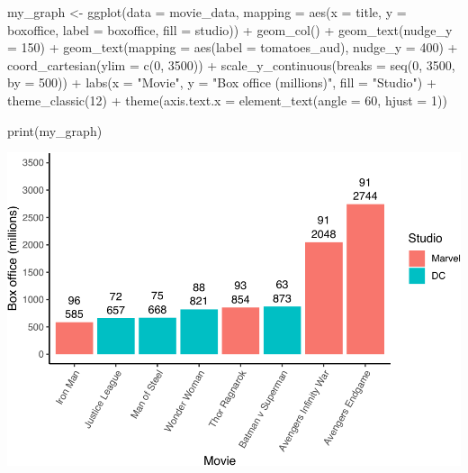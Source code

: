 \documentclass[
]{krantz}
\makeatletter
\newenvironment{Shaded}{\begin{snugshade}}{\end{snugshade}}
\newcommand{\AttributeTok}[1]{\textcolor[rgb]{0.61,0.61,0.61}{#1}}
\newcommand{\DecValTok}[1]{\textcolor[rgb]{0.06,0.06,0.06}{#1}}
\newcommand{\FunctionTok}[1]{\textcolor[rgb]{0,0,0}{#1}}
\newcommand{\NormalTok}[1]{#1}
\newcommand{\OtherTok}[1]{\textcolor[rgb]{0.37,0.37,0.37}{#1}}
\newcommand{\SpecialCharTok}[1]{\textcolor[rgb]{0,0,0}{#1}}
\newcommand{\StringTok}[1]{\textcolor[rgb]{0.5,0.5,0.5}{#1}}
\newenvironment{kframe}{%
\medskip{}
\setlength{\fboxsep}{.8em}
 \def\at@end@of@kframe{}%
 \ifinner\ifhmode%
  \def\at@end@of@kframe{\end{minipage}}%
  \begin{minipage}{\columnwidth}%
 \fi\fi%
 \def\FrameCommand##1{\hskip\@totalleftmargin \hskip-\fboxsep
 \colorbox{shadecolor}{##1}\hskip-\fboxsep
     \hskip-\linewidth \hskip-\@totalleftmargin \hskip\columnwidth}%
 \MakeFramed {\advance\hsize-\width
   \@totalleftmargin\z@ \linewidth\hsize
   \@setminipage}}%
 {\par\unskip\endMakeFramed%
 \at@end@of@kframe}
\renewenvironment{Shaded}{\begin{kframe}}{\end{kframe}}
\makeatother
\begin{document}
\begin{Shaded}
\begin{Highlighting}[]
\NormalTok{my\_graph }\OtherTok{\textless{}{-}} \FunctionTok{ggplot}\NormalTok{(}\AttributeTok{data =}\NormalTok{ movie\_data,}
           \AttributeTok{mapping =} \FunctionTok{aes}\NormalTok{(}\AttributeTok{x =}\NormalTok{ title,}
                         \AttributeTok{y =}\NormalTok{ boxoffice,}
                         \AttributeTok{label =}\NormalTok{ boxoffice, }
                         \AttributeTok{fill =}\NormalTok{ studio)) }\SpecialCharTok{+}
  \FunctionTok{geom\_col}\NormalTok{() }\SpecialCharTok{+}
  \FunctionTok{geom\_text}\NormalTok{(}\AttributeTok{nudge\_y =} \DecValTok{150}\NormalTok{)  }\SpecialCharTok{+}
  \FunctionTok{geom\_text}\NormalTok{(}\AttributeTok{mapping =} \FunctionTok{aes}\NormalTok{(}\AttributeTok{label =}\NormalTok{ tomatoes\_aud), }
            \AttributeTok{nudge\_y =} \DecValTok{400}\NormalTok{) }\SpecialCharTok{+}
  \FunctionTok{coord\_cartesian}\NormalTok{(}\AttributeTok{ylim =} \FunctionTok{c}\NormalTok{(}\DecValTok{0}\NormalTok{, }\DecValTok{3500}\NormalTok{)) }\SpecialCharTok{+}
  \FunctionTok{scale\_y\_continuous}\NormalTok{(}\AttributeTok{breaks =} \FunctionTok{seq}\NormalTok{(}\DecValTok{0}\NormalTok{, }\DecValTok{3500}\NormalTok{, }\AttributeTok{by =} \DecValTok{500}\NormalTok{)) }\SpecialCharTok{+}
  \FunctionTok{labs}\NormalTok{(}\AttributeTok{x =} \StringTok{"Movie"}\NormalTok{,}
       \AttributeTok{y =} \StringTok{"Box office (millions)"}\NormalTok{,}
       \AttributeTok{fill =} \StringTok{"Studio"}\NormalTok{) }\SpecialCharTok{+}
  \FunctionTok{theme\_classic}\NormalTok{(}\DecValTok{12}\NormalTok{) }\SpecialCharTok{+}
  \FunctionTok{theme}\NormalTok{(}\AttributeTok{axis.text.x =} \FunctionTok{element\_text}\NormalTok{(}\AttributeTok{angle =} \DecValTok{60}\NormalTok{, }
                                   \AttributeTok{hjust =} \DecValTok{1}\NormalTok{))  }

\FunctionTok{print}\NormalTok{(my\_graph)}
\end{Highlighting}
\end{Shaded}

\includegraphics[width=0.65\linewidth]{bookdown_files/figure-latex/unnamed-chunk-217-1}
\end{document}
